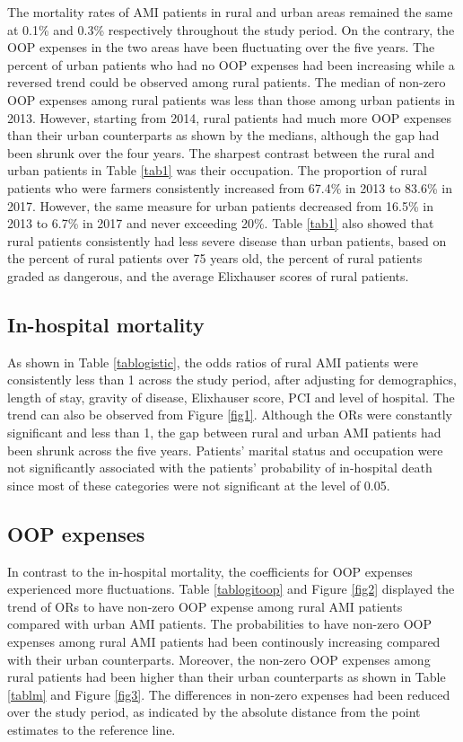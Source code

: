 \documentclass[ijerph,article,submit,moreauthors,pdftex,10pt,a4paper]{mdpi}
\theoremstyle{mdpi}
\newcounter{ex}
\newcounter{re}
\theoremstyle{mdpidefinition}
\begin{document}
The mortality rates of AMI patients in rural and urban areas remained the same at 0.1\% and 0.3\% respectively throughout the study period. On the contrary, the OOP expenses in the two areas have been fluctuating over the five years. The percent of urban patients who had no OOP expenses had been increasing while a reversed trend could be observed among rural patients. The median of non-zero OOP expenses among rural patients was less than those among urban patients in 2013. However, starting from 2014, rural patients had much more OOP expenses than their urban counterparts as shown by the medians, although the gap had been shrunk over the four years. The sharpest contrast between the rural and urban patients in Table \ref{tab1} was their occupation. The proportion of rural patients who were farmers consistently increased from 67.4\% in 2013 to 83.6\% in 2017. However, the same measure for urban patients decreased from 16.5\% in 2013 to 6.7\% in 2017 and never exceeding 20\%. Table \ref{tab1} also showed that rural patients consistently had less severe disease than urban patients, based on the percent of rural patients over 75 years old, the percent of rural patients graded as dangerous, and the average Elixhauser scores of rural patients.


\subsection{In-hospital mortality}
As shown in Table \ref{tablogistic}, the odds ratios of rural AMI patients were consistently less than 1 across the study period, after adjusting for demographics, length of stay, gravity of disease, Elixhauser score, PCI and level of hospital. The trend can also be observed from Figure \ref{fig1}. Although the ORs were constantly significant and less than 1, the gap between rural and urban AMI patients had been shrunk across the five years. Patients' marital status and occupation were not significantly associated with the patients' probability of in-hospital death since most of these categories were not significant at the level of 0.05.

\subsection{OOP expenses}
In contrast to the in-hospital mortality, the coefficients for OOP expenses experienced more fluctuations. Table \ref{tablogitoop} and Figure \ref{fig2} displayed the trend of ORs to have non-zero OOP expense among rural AMI patients compared with urban AMI patients. The probabilities to have non-zero OOP expenses among rural AMI patients had been continously increasing compared with their urban counterparts. Moreover, the non-zero OOP expenses among rural patients had been higher than their urban counterparts as shown in Table \ref{tablm} and Figure \ref{fig3}. The differences in non-zero expenses had been reduced over the study period, as indicated by the absolute distance from the point estimates to the reference line.
\end{document}
